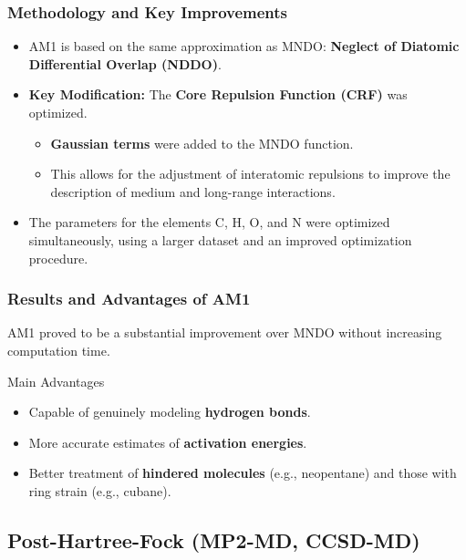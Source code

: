 
\begin{frame}
  \frametitle{Methodology and Key Improvements}
  
  \begin{itemize}
    \item AM1 is based on the same approximation as MNDO: \textbf{Neglect of Diatomic Differential Overlap (NDDO)}. \pause
    \item \textbf{Key Modification:} The \textbf{Core Repulsion Function (CRF)} was optimized. \pause
    \begin{itemize}
        \item \textbf{Gaussian terms} were added to the MNDO function. \pause
        \item This allows for the adjustment of interatomic repulsions to improve the description of medium and long-range interactions. \pause
    \end{itemize}
    \item The parameters for the elements C, H, O, and N were optimized simultaneously, using a larger dataset and an improved optimization procedure.
  \end{itemize}
\end{frame}

\begin{frame}
  \frametitle{Results and Advantages of AM1}
  
  AM1 proved to be a substantial improvement over MNDO without increasing computation time. \pause
  
  \begin{alertblock}{Main Advantages}
    \begin{itemize}
      \item<2-> Capable of genuinely modeling \textbf{hydrogen bonds}. \pause
      \item<3-> More accurate estimates of \textbf{activation energies}. \pause
      \item<4-> Better treatment of \textbf{hindered molecules} (e.g., neopentane) and those with ring strain (e.g., cubane).
    \end{itemize}
  \end{alertblock}
  
\end{frame}

\subsection{Post-Hartree-Fock (MP2-MD, CCSD-MD)}

